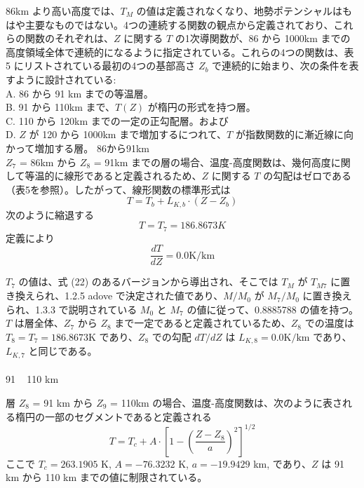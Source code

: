 \documentclass{article}
\begin{document}
86km より高い高度では、$T_M$ の値は定義されなくなり、地勢ポテンシャルはもはや主要なものではない。4つの連続する関数の観点から定義されており、これらの関数のそれぞれは、$Z$ に関する $T$ の1次導関数が、86 から 1000km までの高度領域全体で連続的になるように指定されている。これらの4つの関数は、表 5 にリストされている最初の4つの基部高さ $Z_b$ で連続的に始まり、次の条件を表すように設計されている:\\
\indent A. 86 から 91 km までの等温層。\\
\indent B. 91 から 110km まで、$T(Z)$ が楕円の形式を持つ層。\\
\indent C. 110 から 120km までの一定の正勾配層。および\\
\indent D. $Z$ が 120 から 1000km まで増加するにつれて、$T$ が指数関数的に漸近線に向かって増加する層。
86から91km\\

$Z_7$ = 86km から $Z_8$ = 91km までの層の場合、温度-高度関数は、幾何高度に関して等温的に線形であると定義されるため、$Z$ に関する $T$ の勾配はゼロである（表5を参照）。したがって、線形関数の標準形式は
\begin{equation}
  T = T_b + L_{K,b}\cdot (Z - Z_b)
  \tag{24}
\end{equation}
次のように縮退する
\begin{equation}
  T= T_7 = 186.8673 K
  \tag{25}
\end{equation}
定義により
\begin{equation}
  \frac{dT}{dZ} = 0.0 \text{K/km}
  \tag{26}
\end{equation}

$T_7$ の値は、式 (22) のあるバージョンから導出され、そこでは $T_M$ が $T_{M7}$ に置き換えられ、1.2.5 adove で決定された値であり、$M/M_0$ が $M_7/M_0$ に置き換えられ、1.3.3 で説明されている $M_0$ と $M_7$ の値に従って、0.8885788 の値を持つ。$T$ は層全体、$Z_7$ から $Z_8$ まで一定であると定義されているため、$Z_8$ での温度は $T_8 = T_7 = 186.8673$K であり、$Z_8$ での勾配 $dT/dZ$ は $L_{K,8} = 0.0\text{K/km}$ であり、$L_{K,7}$ と同じである。\\\\
91 ~ 110 km

層 $Z_8$ = 91 km から $Z_9$ = 110km の場合、温度-高度関数は、次のように表される楕円の一部のセグメントであると定義される
\begin{equation}
  T = T_c + A \cdot \left[ 1 - \left( \frac{Z - Z_8}{a} \right)^2 \right]^{1/2}
  \tag{27}
\end{equation}
ここで
$T_c = 263.1905$ K, $A = -76.3232$ K, $a = -19.9429$ km, であり、$Z$ は 91 km から 110 km までの値に制限されている。
\end{document}
